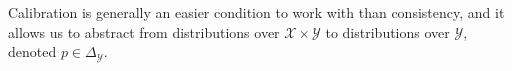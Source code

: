 \documentclass[anon,12pt]{colt2021} %
\newcommand{\reals}{\mathbb{R}}
\newcommand{\simplex}{\Delta_\Y}
\newcommand{\R}{\mathcal{R}}
\newcommand{\X}{\mathcal{X}}
\newcommand{\Y}{\mathcal{Y}}
\newcommand{\toto}{\rightrightarrows}
\begin{document}
Calibration is generally an easier condition to work with than consistency, and it allows us to abstract from distributions over $\X \times \Y$ to distributions over $\Y$, denoted $p \in \simplex$. 

\end{document}
